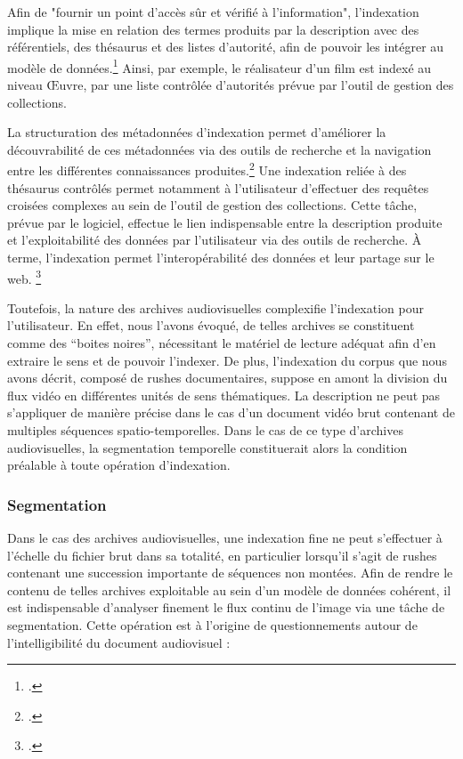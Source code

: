Afin de "fournir un point d'accès sûr et vérifié à l'information", l'indexation implique la mise en relation des termes produits par la description avec des référentiels, des thésaurus et des listes d'autorité, afin de pouvoir les intégrer au modèle de données.\footcite{zotero-item-675} Ainsi, par exemple, le réalisateur d’un film est indexé au niveau Œuvre, par une liste contrôlée d’autorités prévue par l’outil de gestion des collections.  

La structuration des métadonnées d’indexation permet d'améliorer la découvrabilité de ces métadonnées via des outils de recherche et la navigation entre les différentes connaissances produites.\footcite{zotero-item-675} Une indexation reliée à des thésaurus contrôlés permet notamment à l’utilisateur d’effectuer des requêtes croisées complexes au sein de l’outil de gestion des collections. Cette tâche, prévue par le logiciel, effectue le lien indispensable entre la description produite et l’exploitabilité des données par l’utilisateur via des outils de recherche. À terme, l'indexation permet l’interopérabilité des données et leur partage sur le web. \footcite{zotero-item-675}  

Toutefois, la nature des archives audiovisuelles complexifie l’indexation pour l’utilisateur. En effet, nous l’avons évoqué, de telles archives se constituent comme des “boites noires”, nécessitant le matériel de lecture adéquat afin d’en extraire le sens et de pouvoir l’indexer. De plus, l’indexation du corpus que nous avons décrit, composé de rushes documentaires, suppose en amont la division du flux vidéo en différentes unités de sens thématiques. La description ne peut pas s’appliquer de manière précise dans le cas d’un document vidéo brut contenant de multiples séquences spatio-temporelles. Dans le cas de ce type d’archives audiovisuelles, la segmentation temporelle constituerait alors la condition préalable à toute opération d’indexation.  



\subsubsection{Segmentation} 

Dans le cas des archives audiovisuelles, une indexation fine ne peut s’effectuer à l’échelle du fichier brut dans sa totalité, en particulier lorsqu’il s’agit de rushes contenant une succession importante de séquences non montées. Afin de rendre le contenu de telles archives exploitable au sein d’un modèle de données cohérent, il est indispensable d’analyser finement le flux continu de l’image via une tâche de segmentation. Cette opération est à l’origine de questionnements autour de l’intelligibilité du document audiovisuel :  

